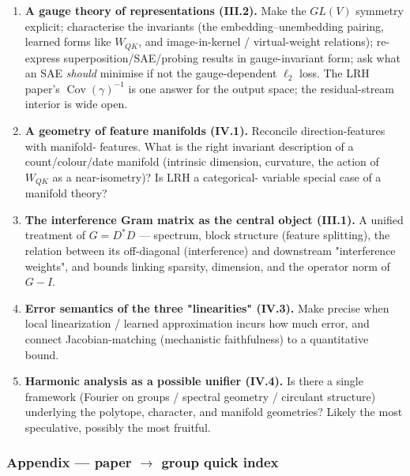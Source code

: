 \begin{enumerate}
\item \textbf{A gauge theory of representations (III.2).} Make the $GL(V)$ symmetry explicit; characterise the invariants (the embedding--unembedding pairing, learned forms like $W_{QK}$, and image-in-kernel / virtual-weight relations); re-express superposition/SAE/probing results in gauge-invariant form; ask what an SAE \emph{should} minimise if not the gauge-dependent $\ell_2$ loss. The LRH paper's $\operatorname{Cov}(\gamma)^{-1}$ is one answer for the output space; the residual-stream interior is wide open.
\item \textbf{A geometry of feature manifolds (IV.1).} Reconcile direction-features with manifold- features. What is the right invariant description of a count/colour/date manifold (intrinsic dimension, curvature, the action of $W_{QK}$ as a near-isometry)? Is LRH a categorical- variable special case of a manifold theory?
\item \textbf{The interference Gram matrix as the central object (III.1).} A unified treatment of $G=D^{*}D$ --- spectrum, block structure (feature splitting), the relation between its off-diagonal (interference) and downstream "interference weights", and bounds linking sparsity, dimension, and the operator norm of $G-I$.
\item \textbf{Error semantics of the three "linearities" (IV.3).} Make precise when local linearization / learned approximation incurs how much error, and connect Jacobian-matching (mechanistic faithfulness) to a quantitative bound.
\item \textbf{Harmonic analysis as a possible unifier (IV.4).} Is there a single framework (Fourier on groups / spectral geometry / circulant structure) underlying the polytope, character, and manifold geometries? Likely the most speculative, possibly the most fruitful.
\end{enumerate}


\subsubsection*{Appendix --- paper $\to$ group quick index}

